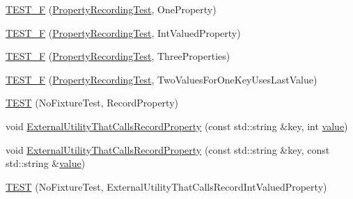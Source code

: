\begin{DoxyCompactItemize}
\item 
\mbox{\hyperlink{_obj__test_2lib_2googletest-master_2googletest_2test_2gtest__xml__output__unittest___8cc_af81998ca9ca595e3107c142ebd25e0d5}{T\+E\+S\+T\+\_\+F}} (\mbox{\hyperlink{class_property_recording_test}{Property\+Recording\+Test}}, One\+Property)
\item 
\mbox{\hyperlink{_obj__test_2lib_2googletest-master_2googletest_2test_2gtest__xml__output__unittest___8cc_adb1f852fc00cf0ee498bdfeda3063904}{T\+E\+S\+T\+\_\+F}} (\mbox{\hyperlink{class_property_recording_test}{Property\+Recording\+Test}}, Int\+Valued\+Property)
\item 
\mbox{\hyperlink{_obj__test_2lib_2googletest-master_2googletest_2test_2gtest__xml__output__unittest___8cc_ae2e5aa08a79eb9b086a145cc06accfc5}{T\+E\+S\+T\+\_\+F}} (\mbox{\hyperlink{class_property_recording_test}{Property\+Recording\+Test}}, Three\+Properties)
\item 
\mbox{\hyperlink{_obj__test_2lib_2googletest-master_2googletest_2test_2gtest__xml__output__unittest___8cc_a261de6777fb791a7556366e938ddb98a}{T\+E\+S\+T\+\_\+F}} (\mbox{\hyperlink{class_property_recording_test}{Property\+Recording\+Test}}, Two\+Values\+For\+One\+Key\+Uses\+Last\+Value)
\item 
\mbox{\hyperlink{_obj__test_2lib_2googletest-master_2googletest_2test_2gtest__xml__output__unittest___8cc_ab78e993a01acfc3e6b0b879351a1e679}{T\+E\+ST}} (No\+Fixture\+Test, Record\+Property)
\item 
void \mbox{\hyperlink{_obj__test_2lib_2googletest-master_2googletest_2test_2gtest__xml__output__unittest___8cc_a8a5eb3769c1d7482bf69f3a03862c6a6}{External\+Utility\+That\+Calls\+Record\+Property}} (const std\+::string \&key, int \mbox{\hyperlink{_obj__test_2lib_2googletest-master_2googlemock_2test_2gmock-matchers__test_8cc_a337b8a670efc0b086ad3af163f3121b6}{value}})
\item 
void \mbox{\hyperlink{_obj__test_2lib_2googletest-master_2googletest_2test_2gtest__xml__output__unittest___8cc_a88d769551f5ca79a6668f6ef64a1abdd}{External\+Utility\+That\+Calls\+Record\+Property}} (const std\+::string \&key, const std\+::string \&\mbox{\hyperlink{_obj__test_2lib_2googletest-master_2googlemock_2test_2gmock-matchers__test_8cc_a337b8a670efc0b086ad3af163f3121b6}{value}})
\item 
\mbox{\hyperlink{_obj__test_2lib_2googletest-master_2googletest_2test_2gtest__xml__output__unittest___8cc_abe7f5c93beecd6501a7b6ccf838f5b10}{T\+E\+ST}} (No\+Fixture\+Test, External\+Utility\+That\+Calls\+Record\+Int\+Valued\+Property)

\end{DoxyCompactItemize}
